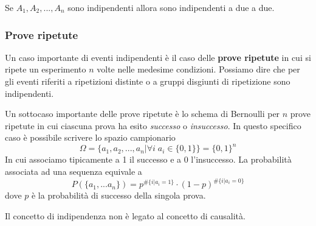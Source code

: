 \begin{observation}
	Se $A_1, A_2, ..., A_n$ sono indipendenti allora sono indipendenti a due a due.
\end{observation}

\subsubsection{Prove ripetute}
Un caso importante di eventi indipendenti è il caso delle \textbf{prove ripetute} in cui si ripete
un esperimento $n$ volte nelle medesime condizioni. Possiamo dire che per gli eventi riferiti a
ripetizioni distinte o a gruppi disgiunti di ripetizione sono indipendenti.

Un sottocaso importante delle prove ripetute è lo schema di Bernoulli per $n$ prove ripetute in
cui ciascuna prova ha esito \emph{successo} o \emph{insuccesso}. In questo specifico caso è
possibile scrivere lo spazio campionario 
\[ \Omega = \{ a_1, a_2, ..., a_n | \forall i \; a_i \in \{ 0, 1 \} \} = \{ 0, 1 \}^n \]
In cui associamo tipicamente a 1 il successo e a 0 l'insuccesso. La probabilità associata ad una
sequenza equivale a
\[ P(\{ a_1, ... a_n \}) = p^{\# \{i | a_i = 1\}} \cdot (1 - p)^{\# \{i | a_i = 0\}}  \]
dove $p$ è la probabilità di successo della singola prova.

\begin{observation}
	Il concetto di indipendenza non è legato al concetto di causalità.
\end{observation}
